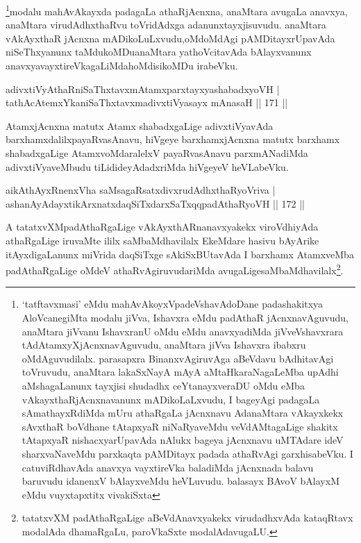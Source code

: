 \begin{artha}
\footnote{`tatftavxmasi' eMdu mahAvAkoyxVpadeVshavAdoDane padashakitxya AloVcanegiMta modalu jiVva, Ishavxra eMdu padAthaR jAcnxnavAguvudu, anaMtara jiVvanu IshavxranU oMdu eMdu anavxyadiMda jiVveVshavxrara tAdAtamxyXjAcnxnavAguvudu, anaMtara jiVva Ishavxra ibabxru oMdAguvudilalx. parasapxra BinanxvAgiruvAga aBeVdavu bAdhitavAgi toVruvudu, anaMtara lakaSxNayA mAyA aMtaHkaraNagaLeMba upAdhi aMshagaLanunx tayxjisi shudadhx ceYtanayxveraDU oMdu eMba vAkayxthaRjAcnxnavanunx mADikoLaLxvudu, I bageyAgi padagaLa sAmathayxRdiMda mUru athaRgaLa jAcnxnavu AdanaMtara vAkayxkekx sAvxthaR boVdhane tAtapxyaR niNaRyaveMdu veVdAMtagaLige shakitx tAtapxyaR nishacxyarUpavAda nAlukx bageya jAcnxnavu uMTAdare ideV sharxvaNaveMdu parxkaqta pAMDitayx padada athaRvAgi garxhisabeVku. I catuviRdhavAda anavxya vayxtireVka baladiMda jAcnxnada balavu baruvudu idanenxV bAlayxveMdu heVLuvudu. balasayx BAvoV bAlayxM eMdu vuyxtapxtitx vivakiSxta}modalu mahAvAkayxda padagaLa athaRjAcnxna, anaMtara avugaLa anavxya, anaMtara virudAdhxthaRvu toVridAdxga adanunx\break tayxjisuvudu. anaMtara vAkAyxthaR jAcnxna mADikoLuLxvudu,\break oMdoMdAgi pAMDitayxrUpavAda niSeThxyanunx taMdukoMDu\break anaMtara yathoVcitavAda bAlayxvanunx anavxyavayxtireVkagaLiMda\break hoMdisikoMDu irabeVku.
\end{artha}


\begin{shl}
adivxtiVyAthaRniSaThxtavxmAtamxparxtayxyashabadxyoVH |\\
tathAcA\s \s temxYkaniSaThxtavxmadivxtiVyasayx mAnasaH \hfill || 171 ||
\end{shl}

\begin{artha}
AtamxjAcnxna matutx Atamx shabadxgaLige adivxtiVyavAda barxhamxdalilx\break payaRvasAnavu, hiVgeye barxhamxjAcnxna matutx barxhamx shabadxgaLige AtamxvoMdaralelxV payaRvasAnavu parxmANadiMda adivxtiVyaveMbudu tiLidideyAdadxriMda hiVgeyeV heVLabeVku.
\end{artha}

\begin{shl}
aikAthAyxRnenxVha saMsagaRsatxdivxrudAdhxthaRyoVriva |\\
ashanAyAdayxtikArxnatxdaqSiTxdarxSaTxqqpadAthaRyoVH \hfill || 172 ||
\end{shl}

\begin{artha}
A tatatxvXMpadAthaRgaLige vAkAyxthARnanavxyakekx viroVdhiyAda athaRgaLige iruvaMte ililx saMbaMdhavilalx EkeMdare hasivu bAyArike itAyxdigaLanunx miVrida daqSiTxge sAkiSxBUtavAda I barxhamx AtamxveMba padAthaRgaLige oMdeV athaRvAgiruvudariMda avugaLige\break saMbaMdhavilalx\footnote{tatatxvXM padAthaRgaLige aBeVdAnavxyakekx virudadhxvAda kataqRtavx modalAda dhamaRgaLu, paroVkaSxte modalAdavugaLU.}.
\end{artha}

